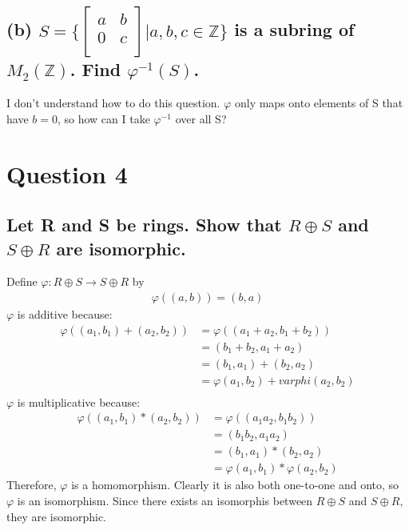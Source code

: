 \documentclass{article}
\begin{document}
\subsection*{(b) \(S = \bigg\{
\begin{bmatrix}
	a & b\\
	0 & c\\
\end{bmatrix} | a,b,c \in \mathds{Z} \bigg\}\) is a subring of \(M_2(\mathds{Z})\). Find \(\varphi^{-1}(S)\).}
I don't understand how to do this question. \(\varphi\) only maps onto elements of S that have \(b = 0\), so how can I take \(\varphi^{-1}\) over all S?
\section*{Question 4}
\subsection*{Let R and S be rings. Show that \(R \oplus S\) and \(S \oplus R\) are isomorphic.}
Define \(\varphi : R \oplus S \rightarrow S \oplus R\) by
\begin{align*}
\varphi((a,b)) = (b,a)
\end{align*}
\(\varphi\) is additive because:
\begin{align*}
\varphi((a_1, b_1) + (a_2,b_2)) &= \varphi((a_1 + a_2, b_1 + b_2))\\
&= (b_1 + b_2, a_1 + a_2)\\
&= (b_1, a_1) + (b_2, a_2)\\
&= \varphi(a_1, b_2) + varphi(a_2, b_2)\\
\end{align*}
\(\varphi\) is multiplicative because:
\begin{align*}
\varphi((a_1, b_1)*(a_2, b_2)) &= \varphi((a_1a_2, b_1b_2))\\
&= (b_1b_2, a_1a_2)\\
&= (b_1, a_1) * (b_2, a_2)\\
&= \varphi(a_1, b_1)*\varphi(a_2, b_2)
\end{align*}
Therefore, \(\varphi\) is a homomorphism. Clearly it is also both one-to-one and onto, so \(\varphi\) is an isomorphism. Since there exists an isomorphis between \(R \oplus S\) and \(S \oplus R\), they are isomorphic.
\end{document}
